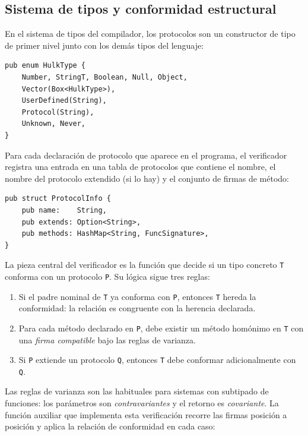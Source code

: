 \documentclass[11pt,a4paper,oneside,openany]{report}
\newcommand{\code}[1]{\texttt{#1}}
\begin{document}
\subsection{Sistema de tipos y conformidad estructural}

En el sistema de tipos del compilador, los protocolos son un constructor
de tipo de primer nivel junto con los demás tipos del lenguaje:

\begin{lstlisting}[style=rustst]
pub enum HulkType {
    Number, StringT, Boolean, Null, Object,
    Vector(Box<HulkType>),
    UserDefined(String),
    Protocol(String),
    Unknown, Never,
}
\end{lstlisting}

Para cada declaración de protocolo que aparece en el programa, el
verificador registra una entrada en una tabla de protocolos que contiene el
nombre, el nombre del protocolo extendido (si lo hay) y el conjunto de
firmas de método:

\begin{lstlisting}[style=rustst]
pub struct ProtocolInfo {
    pub name:    String,
    pub extends: Option<String>,
    pub methods: HashMap<String, FuncSignature>,
}
\end{lstlisting}

La pieza central del verificador es la función que decide si un tipo
concreto \code{T} conforma con un protocolo \code{P}. Su lógica sigue tres
reglas:

\begin{enumerate}
  \item Si el padre nominal de \code{T} ya conforma con \code{P}, entonces
    \code{T} hereda la conformidad: la relación es congruente con la
    herencia declarada.
  \item Para cada método declarado en \code{P}, debe existir un método
    homónimo en \code{T} con una \emph{firma compatible} bajo las reglas de
    varianza.
  \item Si \code{P} extiende un protocolo \code{Q}, entonces \code{T} debe
    conformar adicionalmente con \code{Q}.
\end{enumerate}

Las reglas de varianza son las habituales para sistemas con subtipado de
funciones: los parámetros son \emph{contravariantes} y el retorno es
\emph{covariante}. La función auxiliar que implementa esta verificación
recorre las firmas posición a posición y aplica la relación de conformidad
en cada caso:
\end{document}
